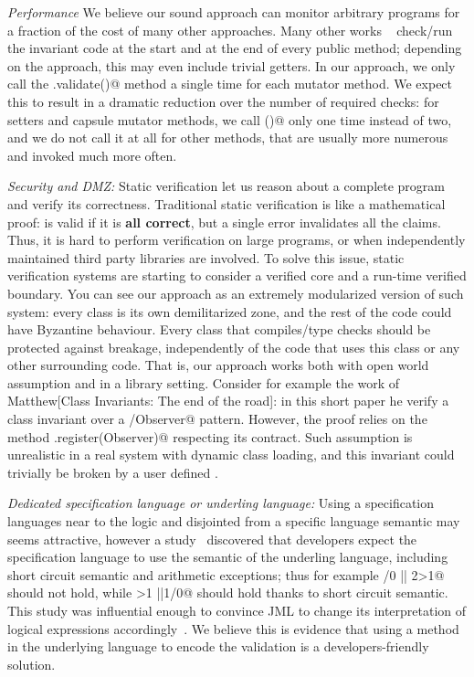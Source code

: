 \noindent\textit{Performance}
We believe our sound approach can monitor arbitrary programs
for a fraction of the cost of many other approaches.
Many other works%
~\cite{feldman2006jose,fahndrich2010embedded,abercrombie2002jcontractor,tran2003design}
 check/run
the invariant code at the start and at the end of every public
method; depending on the approach, this may even include trivial getters.
In  our approach,
we only call the \Q@.validate()@ method a single time for each mutator method.
We expect this to result in a dramatic reduction over
the number of required checks:
for setters and capsule mutator methods, we call \Q@validate()@ only one time instead of two,
and we do not call it at all for other methods, that are usually more numerous and invoked much more often.






\noindent\textit{Security and DMZ:}
Static verification let us reason about a complete program
and verify its correctness.
Traditional static verification is like a mathematical proof: is valid if it is \textbf{all correct},
but a single error invalidates all the claims.
Thus, it is hard to perform verification on large programs, or when independently
maintained third party libraries are involved.
To solve this issue, static verification systems are starting to consider a verified core
and a run-time verified boundary.
You can see our approach as an extremely modularized version of such system:
every class is its own demilitarized zone, and the rest of the code 
could have Byzantine behaviour.
Every class that compiles/type checks should be protected against breakage,
independently of the code that uses this class or any other surrounding code.
That is, our approach works both with open world assumption and in a library setting.
Consider for example the work of Matthew[Class Invariants: The end of the road]:
in this short paper he verify a \Q@Observer@ class invariant over
a \Q@Subject/Observer@ pattern.
However, the proof relies on the method \Q@Subject.register(Observer)@ respecting its contract.
Such assumption is unrealistic in a real system with dynamic class loading,
and this invariant could trivially be broken by a user defined \Q@EvilSubject@.


\noindent\textit{Dedicated specification language or underling language:}
Using a specification languages near to the logic and disjointed from a specific language
semantic may seems attractive, however
a study~\cite{chalin2007logical} discovered that developers expect
the specification language to use the semantic of the underling language, including
short circuit semantic and arithmetic exceptions; thus for example
/0 || 2>1@
should not hold, while 
>1 ||1/0@ should hold thanks to short circuit semantic.
This study was influential enough to convince JML to change its interpretation of logical expressions
accordingly~\cite{chalin2008jml}.
We believe this is evidence that using a method in the underlying language to encode the validation is
a developers-friendly solution.


